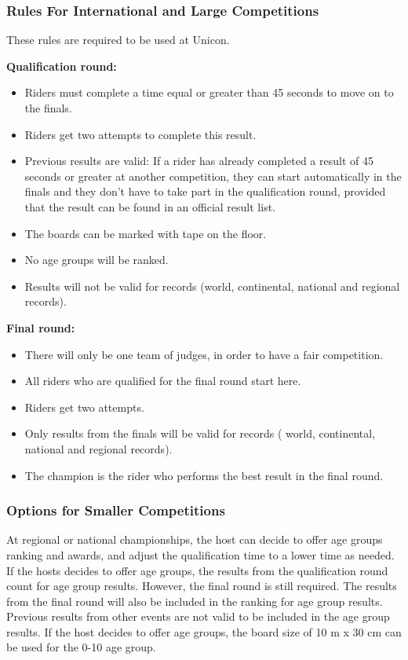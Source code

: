 \subsubsection{Rules For International and Large Competitions}
These rules are required to be used at Unicon.

\textbf{Qualification round:}
\begin{itemize}
\item Riders must complete a time equal or greater than 45 seconds to move on to the finals.
\item Riders get two attempts to complete this result.
\item Previous results are valid: If a rider has already completed a result of 45 seconds or greater at another competition, they can start automatically in the finals and they don't have to take part in the qualification round, provided that the result can be found in an official result list.
\item The boards can be marked with tape on the floor.
\item No age groups will be ranked. 
\item Results will not be valid for records (world, continental, national and regional records).
\end{itemize}

\textbf{Final round:}
\begin{itemize}
\item There will only be one team of judges, in order to have a fair competition. 
\item All riders who are qualified for the final round start here.
\item Riders get two attempts.
\item Only results from the finals will be valid for records ( world, continental, national and regional records).
\item The champion is the rider who performs the best result in the final round.
\end{itemize}

\subsubsection{Options for Smaller Competitions}
At regional or national championships, the host can decide to offer age groups ranking and awards, and adjust the qualification time to a lower time as needed.
If the hosts decides to offer age groups, the results from the qualification round count for age group results.
However, the final round is still required.
The results from the final round will also be included in the ranking for age group results.
Previous results from other events are not valid to be included in the age group results.
If the host decides to offer age groups, the board size of 10 m x 30 cm can be used for the 0-10 age group.

